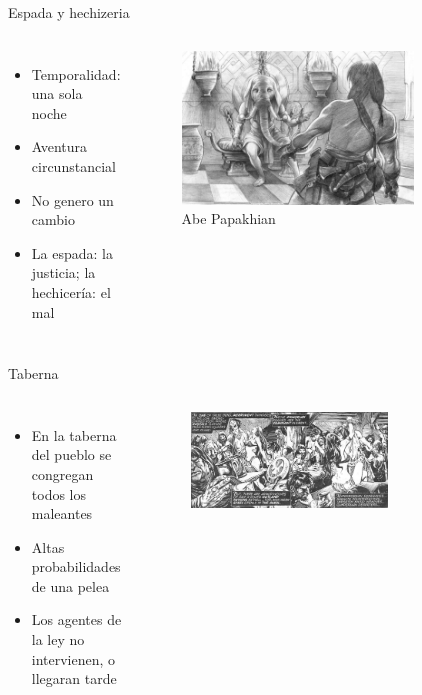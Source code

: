 \begin{frame}{Espada y hechizeria}
\begin{columns}
 \begin{itemize}
    \item Temporalidad: una sola noche
    \item Aventura circunstancial
    \item No genero un cambio
    \item La espada: la justicia; la hechicería: el mal
 \end{itemize}
 \begin{figure}[htb]
    \centering
    \includegraphics[width=0.8\textwidth]{img/tributos/elephant07}
    \caption{Abe Papakhian}
 \end{figure}
 \end{columns}
\end{frame}
\note[itemize]{
	\item
}

\begin{frame}{Taberna}
	\begin{columns}
		\begin{itemize}
			\item En la taberna del pueblo se congregan todos los maleantes
			\item Altas probabilidades de una pelea
			\item Los agentes de la ley no intervienen, o llegaran tarde
		\end{itemize}
		\begin{figure}[htb]
			\centering
			\includegraphics[width=0.7\textwidth]{img/tropes/taberna}
		\end{figure}
	\end{columns}
\end{frame}
\note[itemize]{
	\item
}


